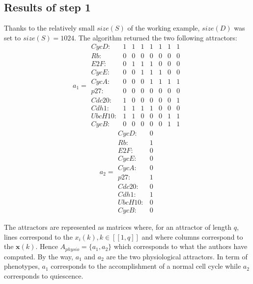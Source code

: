 \documentclass[oneside,a4paper,onecolumn,notitlepage]{article}
\begin{document}
\subsection{Results of step 1}
Thanks to the relatively small $size(S)$ of the working example, $size(D)$ was set to $size(S)=1024$. The algorithm returned the two following attractors:
\begin{equation*}
a_{1}=
\begin{matrix}
CycD:&1&1&1&1&1&1&1\\
Rb:&0&0&0&0&0&0&0\\
E2F:&0&1&1&1&0&0&0\\
CycE:&0&0&1&1&1&0&0\\
CycA:&0&0&0&1&1&1&1\\
p27:&0&0&0&0&0&0&0\\
Cdc20:&1&0&0&0&0&0&1\\
Cdh1:&1&1&1&1&0&0&0\\
UbcH10:&1&1&0&0&0&1&1\\
CycB:&0&0&0&0&0&1&1
\end{matrix}
\end{equation*}
\begin{equation*}
a_{2}=
\begin{matrix}
CycD:&0\\
Rb:&1\\
E2F:&0\\
CycE:&0\\
CycA:&0\\
p27:&1\\
Cdc20:&0\\
Cdh1:&1\\
UbcH10:&0\\
CycB:&0
\end{matrix}
\end{equation*}

The attractors are represented as matrices where, for an attractor of length $q$, lines correspond to the $x_i(k), k\in [\![1,q]\!]$ and where columns correspond to the $\boldsymbol{x}(k)$.
Hence $A_{physio}=\lbrace a_{1},a_{2}\rbrace$ which corresponds to what the authors have computed. By the way, $a_{1}$ and $a_{2}$ are the two physiological attractors. In term of phenotypes, $a_{1}$ corresponds to the accomplishment of a normal cell cycle while $a_{2}$ corresponds to quiescence.
\end{document}
